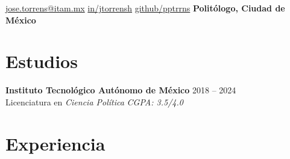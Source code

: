 \documentclass[letter]{resume}
\begin{document}

\begin{center}
\normalsize
{}
{\href{mailto://jose.torrens@itam.mx}{jose.torrens@itam.mx}}
{\href{https://www.linkedin.com/in/jtorrensh/}{in/jtorrensh}}
{\href{https://github.com/pptrrns}{github/pptrrns}}
\bfseries{Politólogo, Ciudad de México}

\end{center}



\section{Estudios}

\begin{content}

{\bf Instituto Tecnológico Autónomo de México} \hfill{2018 -- 2024}\\ 
{Licenciatura en \emph{Ciencia Política}} \hfill \emph{CGPA: 3.5/4.0}

\sectionlineskip
\end{content}


\section{Experiencia}
\end{document}
